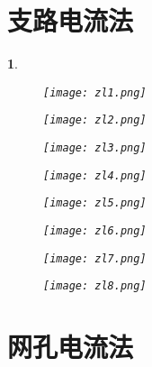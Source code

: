\documentclass[UTF8]{report}
\theoremstyle{MyLineTheoremStyle} %
\theoremstyle{MyBlockTheoremStyle} %
\theoremstyle{MySubsubsectionStyle} %
\newtheorem{definition}{}
\begin{document}
\section{支路电流法}

\begin{definition}
    \begin{figure}[H]
        \centering
        \texttt{[image: zl1.png]}
    \end{figure}

    \begin{figure}[H]
        \centering
        \texttt{[image: zl2.png]}
    \end{figure}

    \begin{figure}[H]
        \centering
        \texttt{[image: zl3.png]}
    \end{figure}

    \begin{figure}[H]
        \centering
        \texttt{[image: zl4.png]}
    \end{figure}

    \begin{figure}[H]
        \centering
        \texttt{[image: zl5.png]}
    \end{figure}

    \begin{figure}[H]
        \centering
        \texttt{[image: zl6.png]}
    \end{figure}

    \begin{figure}[H]
        \centering
        \texttt{[image: zl7.png]}
    \end{figure}

    \begin{figure}[H]
        \centering
        \texttt{[image: zl8.png]}
    \end{figure}
\end{definition}


\section{网孔电流法}
\end{document}
